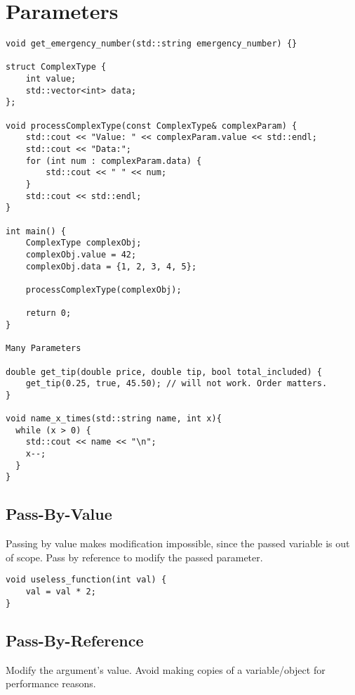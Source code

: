 \documentclass[openany]{report}
\begin{document}
\section{Parameters}

\begin{verbatim}
void get_emergency_number(std::string emergency_number) {}

struct ComplexType {
    int value;
    std::vector<int> data;
};

void processComplexType(const ComplexType& complexParam) {
    std::cout << "Value: " << complexParam.value << std::endl;
    std::cout << "Data:";
    for (int num : complexParam.data) {
        std::cout << " " << num;
    }
    std::cout << std::endl;
}

int main() {
    ComplexType complexObj;
    complexObj.value = 42;
    complexObj.data = {1, 2, 3, 4, 5};

    processComplexType(complexObj);

    return 0;
}

Many Parameters

double get_tip(double price, double tip, bool total_included) {
    get_tip(0.25, true, 45.50); // will not work. Order matters. 
}

void name_x_times(std::string name, int x){
  while (x > 0) {
    std::cout << name << "\n";
    x--;
  }
}
\end{verbatim}

\subsection{Pass-By-Value}

Passing by value makes modification impossible, since the passed variable is out of scope.
Pass by reference to modify the passed parameter.

\begin{verbatim}
void useless_function(int val) {
    val = val * 2;
}
\end{verbatim}


\subsection{Pass-By-Reference}

Modify the argument's value.
Avoid making copies of a variable/object for performance reasons.
\end{document}

